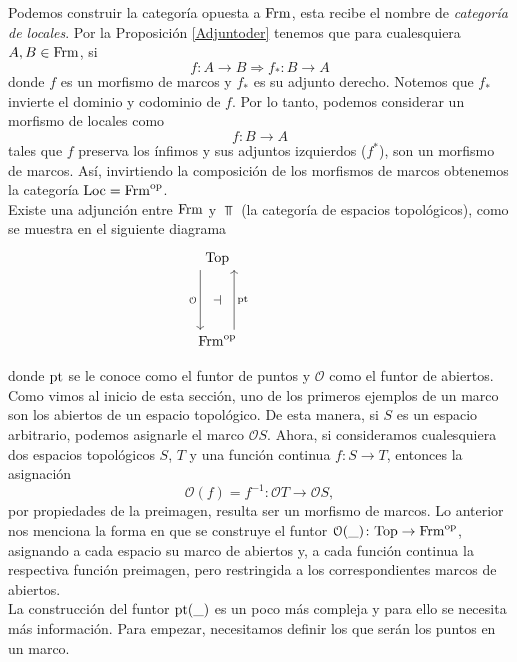 \documentclass{comunicaciones}
\begin{document}
        Podemos construir la categoría opuesta a $\mathrm{Frm}$, esta recibe el nombre de \emph{categoría de locales}. Por la Proposición \ref{Adjuntoder} tenemos que para cualesquiera $A, B\in \mathrm{Frm}$, si
        \[
        f\colon A\rightarrow B \Longrightarrow f_*\colon B\rightarrow A
        \]
        donde $f$ es un morfismo de marcos y $f_*$ es su adjunto derecho. Notemos que $f_*$ invierte el dominio y codominio de $f$. Por lo tanto, podemos considerar un morfismo de locales como 
        \[
        f\colon B\rightarrow A 
        \]
        tales que $f$ preserva los ínfimos y sus adjuntos izquierdos ($f^*$), son un morfismo de marcos. Así, invirtiendo la composición de los morfismos de marcos obtenemos la categoría $\mathrm{Loc}=\mathrm{Frm}^{\mathrm{op}}$.\\
        
        Existe una adjunción entre $\mathrm{Frm}$ y $\Top$ (la categoría de espacios topológicos), como se muestra en el siguiente diagrama
        \[\begin{tikzcd}
	{\Top} \\
	{} & {} & {} \\
	{\Frm^{\op}}
	\arrow["{\pt}"{name=0, swap}, from=3-1, to=1-1, shift right=5]
	\arrow["{\mathcal{O}}"{name=1, swap}, from=1-1, to=3-1, shift right=5]
	\arrow["\dashv"{rotate=0}, from=1, to=0, phantom]
\end{tikzcd}\]


        donde $\mathrm{pt}$ se le conoce como el funtor de puntos y $\mathcal{O}$ como el funtor de abiertos.\\
        
Como vimos al inicio de esta sección, uno de los primeros ejemplos de un marco son los abiertos de un espacio topológico. De esta manera, si $S$ es un espacio arbitrario, podemos asignarle el marco $\mathcal{O}S$. Ahora, si consideramos cualesquiera dos espacios topológicos $S$, $T$ y una función continua $f\colon S\to T$, entonces la asignación
\[
\mathcal{O}(f)=f^{-1}\colon \mathcal{O}T\to \mathcal{O}S,
\]
por propiedades de la preimagen, resulta ser un morfismo de marcos. Lo anterior nos menciona la forma en que se construye el funtor $\mathcal{O}(\_)\colon \mathrm{Top}\to \mathrm{Frm}^{\mathrm{op}}$, asignando a cada espacio su marco de abiertos y, a cada función continua la respectiva función preimagen, pero restringida a los correspondientes marcos de abiertos.\\

La construcción del funtor $\mathrm{pt}(\_)$ es un poco más compleja y para ello se necesita más información. Para empezar, necesitamos definir los que serán los puntos en un marco. 
\end{document}

